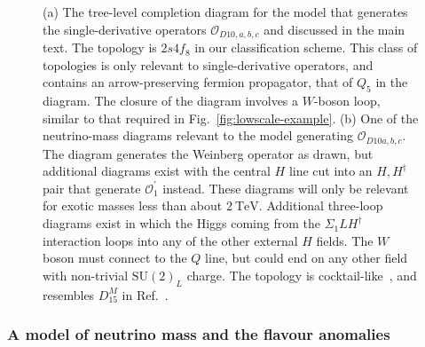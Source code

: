 \begin{figure}[t]
  \centering
  \caption[(a) The tree-level completion diagram for the model that generates
  the single-derivative operators $\mathcal{O}_{D10,a,b,c}$ and discussed in the
  main text. (b) One of the neutrino-mass diagrams relevant to the model
  generating $\mathcal{O}_{D10a,b,c}$.]{(a) The tree-level completion diagram
    for the model that generates the single-derivative operators
    $\mathcal{O}_{D10,a,b,c}$ and discussed in the main text. The topology is
    $2s4f_{8}$ in our classification scheme. This class of topologies is only
    relevant to single-derivative operators, and contains an arrow-preserving
    fermion propagator, that of $Q_{5}$ in the diagram. The closure of the
    diagram involves a $W$-boson loop, similar to that required in
    Fig.~\ref{fig:lowscale-example}. (b) One of the neutrino-mass diagrams
    relevant to the model generating $\mathcal{O}_{D10a,b,c}$. The diagram
    generates the Weinberg operator as drawn, but additional diagrams exist with
    the central $H$ line cut into an $H,H^{\dagger}$ pair that generate
    $\mathcal{O}^{\prime}_{1}$ instead. These diagrams will only be relevant for
    exotic masses less than about $\SI{2}{\TeV}$. Additional three-loop diagrams
    exist in which the Higgs coming from the $\Sigma_{1}LH^{\dagger}$
    interaction loops into any of the other external $H$ fields. The $W$ boson
    must connect to the $Q$ line, but could end on any other field with
    non-trivial $\mathrm{SU}(2)_{L}$ charge. The topology is
    cocktail-like~\cite{Gustafsson:2012vj}, and resembles $D^{M}_{15}$ in
    Ref.~\cite{Cepedello:2018rfh}.}
  \label{fig:derivative-example-diagrams}
\end{figure}

\subsubsection{A model of neutrino mass and the flavour anomalies}

